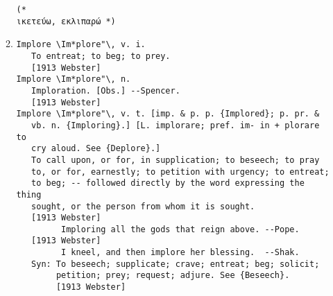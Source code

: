 \documentclass{article}
\begin{document}
\begin{itemize}
\begin{enumerate}
{\begin{lstlisting}
(* 
ικετεύω, εκλιπαρώ *)
\end{lstlisting}}
\item{
\begin{lstlisting}
Implore \Im*plore"\, v. i.
   To entreat; to beg; to prey.
   [1913 Webster]
Implore \Im*plore"\, n.
   Imploration. [Obs.] --Spencer.
   [1913 Webster]
Implore \Im*plore"\, v. t. [imp. & p. p. {Implored}; p. pr. &
   vb. n. {Imploring}.] [L. implorare; pref. im- in + plorare to
   cry aloud. See {Deplore}.]
   To call upon, or for, in supplication; to beseech; to pray
   to, or for, earnestly; to petition with urgency; to entreat;
   to beg; -- followed directly by the word expressing the thing
   sought, or the person from whom it is sought.
   [1913 Webster]
         Imploring all the gods that reign above. --Pope.
   [1913 Webster]
         I kneel, and then implore her blessing.  --Shak.
   Syn: To beseech; supplicate; crave; entreat; beg; solicit;
        petition; prey; request; adjure. See {Beseech}.
        [1913 Webster]
\end{lstlisting}}
\end{enumerate}
\end{itemize}
\end{document}
